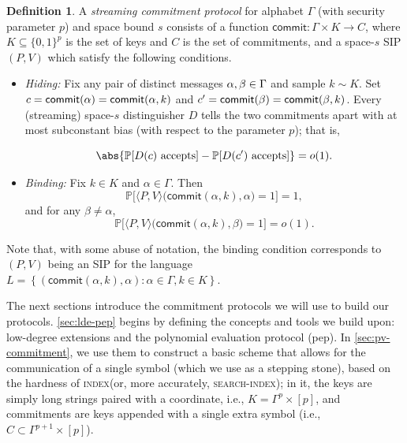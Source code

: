 \documentclass[a4paper,UKenglish,cleveref, autoref, thm-restate]{lipics-v2021}
\theoremstyle{definition}
\newtheorem{definition}[theorem]{Definition}
\renewcommand{\P}{\mathbb P}
\renewcommand{\set}[1]{\left\{#1\right\}}
\newcommand{\bitset}{\{0,1\}}
\newcommand{\indexproblem}{\normalfont\textsc{index}\xspace}
\newcommand{\searchindex}{\normalfont\textsc{search-index}\xspace}
\newcommand{\pepprotocol}{\textsf{pep}\xspace}
\newcommand{\pcommitlength}{p}
\newcommand{\alphabet}{\Gamma}
\def\symbol#1{
    \ifnum#1=1
        \alpha
    \else
    \ifnum#1=2
        \beta
    \else
    \ifnum#1=3
        \gamma
    \fi\fi\fi
}
\begin{document}
\begin{definition}
\label{def:commitment}
A \emph{streaming commitment protocol} for alphabet $\alphabet$ (with security parameter $\pcommitlength$) and space bound $s$ consists of a function $\textsf{commit}: \alphabet \times K \to C$, where $K \subseteq \bitset^\pcommitlength$ is the set of keys and $C$ is the set of commitments, and a space-$s$ SIP $(P,V)$ which satisfy the following conditions.

\begin{itemize}
    \item \emph{Hiding:} Fix any pair of distinct messages $\symbol1, \symbol2 \in\alphabet$ and sample $k \sim K$. Set $c = \textsf{commit}(\symbol1) = \textsf{commit}(\symbol1, k)$ and $c' = \textsf{commit}(\symbol2) = \textsf{commit}(\symbol2, k)$. Every (streaming) space-$s$ distinguisher $D$ tells the two commitments apart with at most subconstant bias (with respect to the parameter $\pcommitlength$); that is,

    \begin{equation*}
        \abs{\P[D(c) \text{ accepts}] - \P[D(c') \text{ accepts}]} = o(1).
    \end{equation*}

    \item \emph{Binding:} Fix $k \in K$ and $\alpha \in \alphabet$. Then
    \begin{equation*}
        \P\big[\langle P, V\rangle\big(\textsf{commit}(\alpha, k), \alpha\big) = 1\big] = 1,
    \end{equation*}
    and for any $\beta \neq \alpha$,
    \begin{equation*}
        \P\big[\langle P, V\rangle\big(\textsf{commit}(\alpha, k), \beta\big) = 1\big] = o(1).
    \end{equation*}
\end{itemize}
\end{definition}

Note that, with some abuse of notation, the binding condition corresponds to $(P,V)$ being an SIP for the language $L = \set{(\textsf{commit}(\alpha, k), \alpha) : \alpha \in \alphabet, k \in K}$.

The next sections introduce the commitment protocols we will use to build our protocols. \cref{sec:lde-pep} begins by defining the concepts and tools we build upon: low-degree extensions and the polynomial evaluation protocol (\pepprotocol). In \cref{sec:pv-commitment}, we use them to construct a basic scheme that allows for the communication of a single symbol (which we use as a stepping stone), based on the hardness of \indexproblem (or, more accurately, \searchindex); in it, the keys are simply long strings paired with a coordinate, i.e., $K = \alphabet^\pcommitlength \times [\pcommitlength]$, and commitments are keys appended with a single extra symbol (i.e., $C \subset \alphabet^{\pcommitlength + 1} \times [\pcommitlength]$).
\end{document}

